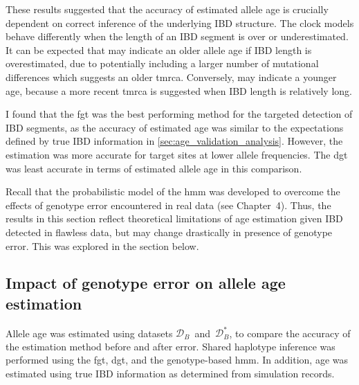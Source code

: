 These results suggested that the accuracy of estimated allele age is crucially dependent on correct inference of the underlying IBD structure.
The clock models behave differently when the length of an IBD segment is over or underestimated.
It can be expected that \ClockM may indicate an older allele age if IBD length is overestimated, due to potentially including a larger number of mutational differences which suggests an older \gls{tmrca}.
Conversely, \ClockR may indicate a younger age, because a more recent \gls{tmrca} is suggested when IBD length is relatively long.



I found that the \gls{fgt} was the best performing method for the targeted detection of IBD segments, as the accuracy of estimated age was similar to the expectations defined by true IBD information in \cref{sec:age_validation_analysis}.
However, the estimation was more accurate for target sites at lower allele frequencies.
The \gls{dgt} was least accurate in terms of estimated allele age in this comparison.

Recall that the probabilistic model of the \gls{hmm} was developed to overcome the effects of genotype error encountered in real data (see Chapter~4).
Thus, the results in this section reflect theoretical limitations of age estimation given IBD detected in flawless data, but may change drastically in presence of genotype error.
This was explored in the section below.



%
\subsection{Impact of genotype error on allele age estimation}
\label{sec:age_generror}
%

Allele age was estimated using datasets $\mathcal{D}_B$~and~$\mathcal{D}_B^{\ast}$, to compare the accuracy of the estimation method before and after error.
Shared haplotype inference was performed using the \gls{fgt}, \gls{dgt}, and the genotype-based \gls{hmm}.
In addition, age was estimated using true IBD information as determined from simulation records.

